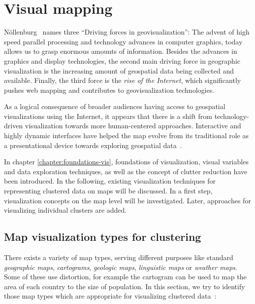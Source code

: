 
%
%

\section{Visual mapping}
\label{state-vis}

N\"{o}llenburg~\cite{noellenburg11geovis} names three ``Driving forces in geovisualization'': The advent of high speed parallel processing and technology advances in computer graphics, today allows us to grasp enormous amounts of information. Besides the advances in graphics and display technologies, the second main driving force in geographic visualization is the increasing amount of geospatial data being collected and available. Finally, the third force is the \textit{rise of the Internet}, which significantly pushes web mapping and contributes to geovisualization technologies.

As a logical consequence of broader audiences having access to geospatial visualizations using the Internet, it appears that there is a shift from technology-driven visualization towards more human-centered approaches. Interactive and highly dynamic interfaces have helped the map evolve from its traditional role as a presentational device towards exploring geospatial data~\cite{noellenburg11geovis, vislecture}.

In chapter \ref{chapter:foundations-vis}, foundations of visualization, visual variables and data exploration techniques, as well as the concept of clutter reduction have been introduced. In the following, existing visualization techniques for representing clustered data on maps will be discussed. In a first step, visualization concepts on the map level will be investigated. Later, approaches for visualizing individual clusters are added. 

\subsection{Map visualization types for clustering}
\label{chapter:map-vis}

There exists a variety of map types, serving different purposes like standard \textit{geographic maps}, \textit{cartograms}, \textit{geologic maps}, \textit{linguistic maps} or \textit{weather maps}. Some of these use distortion, for example the cartogram can be used to map the area of each country to the size of population. In this section, we try to identify those map types which are appropriate for visualizing clustered data~\cite{noellenburg11geovis, wiki:map-types}:

